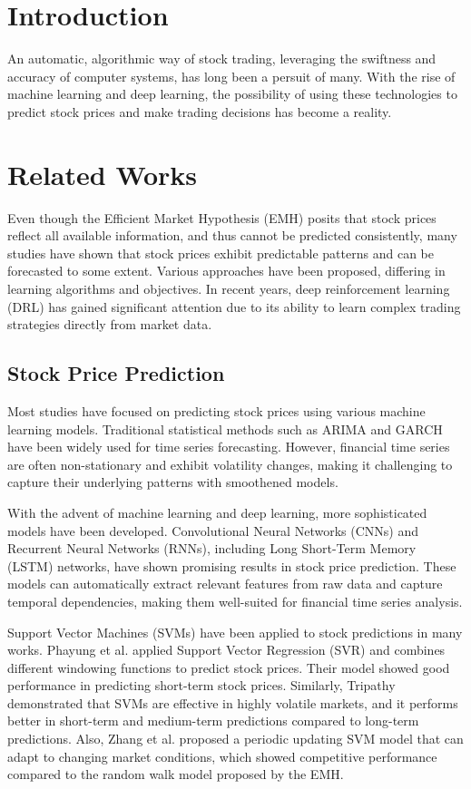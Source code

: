 \documentclass[conference]{IEEEtran}
\begin{document}
\section{Introduction}

An automatic, algorithmic way of stock trading, leveraging the
swiftness and accuracy of computer systems, has long been a persuit
of many. With the rise of machine learning and deep learning, the
possibility of using these technologies to predict stock prices and
make trading decisions has become a reality.


\section{Related Works}

Even though the Efficient Market Hypothesis (EMH) posits that stock
prices reflect all available information, and thus cannot be
predicted consistently, many studies have shown that stock prices
exhibit predictable patterns and can be forecasted to some extent.
Various approaches have been proposed, differing in learning
algorithms and objectives. In recent years, deep reinforcement
learning (DRL) has gained significant attention due to its ability to
learn complex trading strategies directly from market data.

\subsection{Stock Price Prediction}

Most studies have focused on predicting stock prices using various
machine learning models. Traditional statistical methods such as
ARIMA and GARCH have been widely used for time series forecasting.
However, financial time series are often non-stationary and exhibit
volatility changes, making it challenging to capture their underlying
patterns with smoothened models.

With the advent of machine learning and deep learning, more
sophisticated models have been developed. Convolutional Neural
Networks (CNNs) and Recurrent Neural Networks (RNNs), including Long
Short-Term Memory (LSTM) networks, have shown promising results in
stock price prediction. These models can automatically extract
relevant features from raw data and capture temporal dependencies,
making them well-suited for financial time series analysis.

Support Vector Machines (SVMs) have been applied to stock predictions
in many works. Phayung et al. \cite{phayung2013} applied Support
Vector Regression (SVR) and combines different windowing functions to
predict stock prices. Their model showed good performance in
predicting short-term stock prices. Similarly, Tripathy
\cite{tripathy2019} demonstrated that SVMs are effective in highly
volatile markets, and it performs better in short-term and
medium-term predictions compared to long-term predictions. Also,
Zhang et al. \cite{zhang2017} proposed a periodic updating SVM model
that can adapt to changing market conditions, which showed
competitive performance compared to the random walk model proposed by the EMH.
\end{document}
